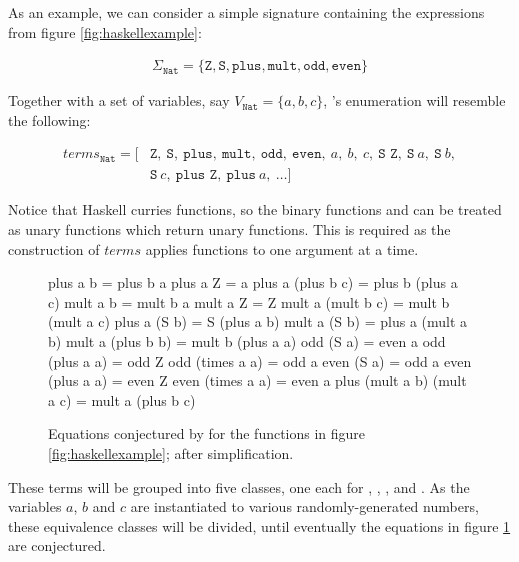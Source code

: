 As an example, we can consider a simple signature containing the expressions from figure \ref{fig:haskellexample}:

\begin{align*}
  \Sigma_{\texttt{Nat}} = \{\texttt{Z}, \texttt{S}, \texttt{plus}, \texttt{mult}, \texttt{odd}, \texttt{even}\}
\end{align*}

Together with a set of variables, say $V_{\texttt{Nat}} = \{a, b, c\}$, \qspec{}'s enumeration will resemble the following:

\begin{align*}
  terms_{\texttt{Nat}} = [& \texttt{Z},\ \texttt{S},\ \texttt{plus},\ \texttt{mult},\ \texttt{odd},\ \texttt{even},\ a,\ b,\ c,\ \texttt{S Z},\ \texttt{S}\ a,\ \texttt{S}\ b, \\
                     & \texttt{S}\ c,\ \texttt{plus Z},\ \texttt{plus}\ a,\ \dots ]
\end{align*}

Notice that Haskell curries functions, so the binary functions  and  can be treated as unary functions which return unary functions. This is required as the construction of $terms$ applies functions to one argument at a time.

\begin{figure}
  \begin{haskell}
                  plus a b = plus b a
                  plus a Z = a
         plus a (plus b c) = plus b (plus a c)
                  mult a b = mult b a
                  mult a Z = Z
         mult a (mult b c) = mult b (mult a c)
              plus a (S b) = S (plus a b)
              mult a (S b) = plus a (mult a b)
         mult a (plus b b) = mult b (plus a a)
                 odd (S a) = even a
            odd (plus a a) = odd Z
           odd (times a a) = odd a
                even (S a) = odd a
           even (plus a a) = even Z
          even (times a a) = even a
plus (mult a b) (mult a c) = mult a (plus b c)
  \end{haskell}
  \caption{Equations conjectured by \qspec{} for the functions in figure \ref{fig:haskellexample}; after simplification.}
  \label{fig:qspecresult}
\end{figure}

These terms will be grouped into five classes, one each for , , ,  and . As the variables $a$, $b$ and $c$ are instantiated to various randomly-generated numbers, these equivalence classes will be divided, until eventually the equations in figure \ref{fig:qspecresult} are conjectured.

